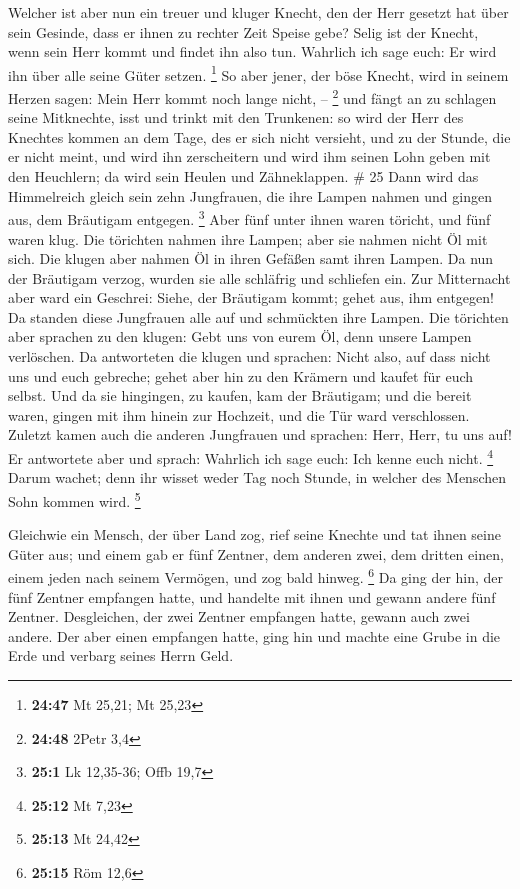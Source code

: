 Welcher ist aber nun ein treuer und kluger Knecht, den
der Herr gesetzt hat über sein Gesinde, dass er ihnen zu rechter Zeit
Speise gebe?  Selig ist der Knecht, wenn sein Herr kommt
und findet ihn also tun.  Wahrlich ich sage euch: Er wird
ihn über alle seine Güter setzen. \footnote{\textbf{24:47} Mt 25,21; Mt
  25,23}  So aber jener, der böse Knecht, wird in seinem
Herzen sagen: Mein Herr kommt noch lange nicht, -- \footnote{\textbf{24:48}
  2Petr 3,4}  und fängt an zu schlagen seine Mitknechte,
isst und trinkt mit den Trunkenen:  so wird der Herr des
Knechtes kommen an dem Tage, des er sich nicht versieht, und zu der
Stunde, die er nicht meint,  und wird ihn zerscheitern
und wird ihm seinen Lohn geben mit den Heuchlern; da wird sein Heulen
und Zähneklappen. \# 25  Dann wird das Himmelreich gleich
sein zehn Jungfrauen, die ihre Lampen nahmen und gingen aus, dem
Bräutigam entgegen. \footnote{\textbf{25:1} Lk 12,35-36; Offb 19,7}
 Aber fünf unter ihnen waren töricht, und fünf waren klug.
 Die törichten nahmen ihre Lampen; aber sie nahmen nicht
Öl mit sich.  Die klugen aber nahmen Öl in ihren Gefäßen
samt ihren Lampen.  Da nun der Bräutigam verzog, wurden
sie alle schläfrig und schliefen ein.  Zur Mitternacht
aber ward ein Geschrei: Siehe, der Bräutigam kommt; gehet aus, ihm
entgegen!  Da standen diese Jungfrauen alle auf und
schmückten ihre Lampen.  Die törichten aber sprachen zu
den klugen: Gebt uns von eurem Öl, denn unsere Lampen verlöschen.
 Da antworteten die klugen und sprachen: Nicht also, auf
dass nicht uns und euch gebreche; gehet aber hin zu den Krämern und
kaufet für euch selbst.  Und da sie hingingen, zu kaufen,
kam der Bräutigam; und die bereit waren, gingen mit ihm hinein zur
Hochzeit, und die Tür ward verschlossen.  Zuletzt kamen
auch die anderen Jungfrauen und sprachen: Herr, Herr, tu uns auf!
 Er antwortete aber und sprach: Wahrlich ich sage euch:
Ich kenne euch nicht. \footnote{\textbf{25:12} Mt 7,23} 
Darum wachet; denn ihr wisset weder Tag noch Stunde, in welcher des
Menschen Sohn kommen wird. \footnote{\textbf{25:13} Mt 24,42}

 Gleichwie ein Mensch, der über Land zog, rief seine
Knechte und tat ihnen seine Güter aus;  und einem gab er
fünf Zentner, dem anderen zwei, dem dritten einen, einem jeden nach
seinem Vermögen, und zog bald hinweg. \footnote{\textbf{25:15} Röm 12,6}
 Da ging der hin, der fünf Zentner empfangen hatte, und
handelte mit ihnen und gewann andere fünf Zentner. 
Desgleichen, der zwei Zentner empfangen hatte, gewann auch zwei andere.
 Der aber einen empfangen hatte, ging hin und machte eine
Grube in die Erde und verbarg seines Herrn Geld.

